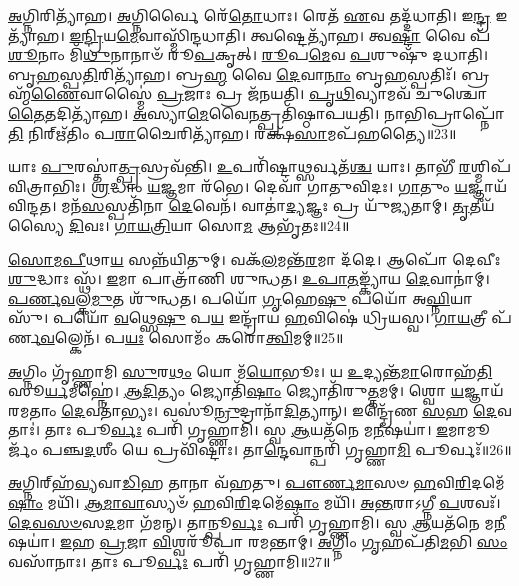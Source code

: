 \-\ul{𑌅}\-𑌗𑍍𑌨𑌿𑌰𑌿𑌤𑍍𑌯𑌾᳴𑌹।
\-\ul{𑌅}\-𑌗𑍍𑌨𑌿𑌰𑍍𑌵𑍈 𑌰𑍇᳴\-\ul{𑌤𑍋}\-𑌧𑌾𑌃।
𑌰𑍇𑌤᳴ \ul{𑌏}\-𑌵 𑌤𑌦𑍍𑌦᳴𑌧𑌾𑌤𑌿।
𑌇\-\ul{𑌨𑍍𑌦𑍍𑌰} 𑌇𑌤𑍍𑌯𑌾᳴𑌹।
\-\ul{𑌇}\-\-\ul{𑌨𑍍𑌦𑍍𑌰𑌿}\-𑌯\-\ul{𑌮𑍇}\-𑌵𑌾𑌸𑍍𑌮𑌿᳴𑌨𑍍𑌦𑌧𑌾𑌤𑌿।
𑌤𑍍𑌵𑌷𑍍𑌟𑍇𑌤𑍍𑌯𑌾᳴𑌹।
𑌤𑍍𑌵\-\ul{𑌷𑍍𑌟𑌾} 𑌵𑍈 𑌪᳴\-\ul{𑌶𑍂}\-𑌨𑌾𑌂 𑌮𑌿᳴\-\ul{𑌥𑍁}\-𑌨𑌾𑌨𑌾𑍞᳴ 𑌰𑍂\-\ul{𑌪}\-𑌕𑍃𑌤𑍍।
\-\ul{𑌰𑍂}\-𑌪\-\ul{𑌮𑍇}\-𑌵 \ul{𑌪}\-𑌶𑍁𑌷𑍁᳴ 𑌦𑌧𑌾𑌤𑌿।
𑌬𑍃\-\ul{𑌹}\-𑌸𑍍𑌪\-\ul{𑌤𑌿}\-𑌰𑌿𑌤𑍍𑌯𑌾᳴𑌹।
𑌬𑍍𑌰\-\ul{𑌹𑍍𑌮} 𑌵𑍈 \ul{𑌦𑍇}\-𑌵𑌾\-\ul{𑌨𑌾𑌂} 𑌬𑍃\-\ul{𑌹}\-𑌸𑍍𑌪𑌤𑌿𑌃᳴।
𑌬𑍍𑌰𑌹𑍍𑌮᳴\-\ul{𑌣𑍈}\-𑌵𑌾𑌸𑍍𑌮𑍈॑ \ul{𑌪𑍍𑌰}\-𑌜𑌾𑌃 𑌪𑍍𑌰 𑌜᳴𑌨𑌯𑌤𑌿।
\-\ul{𑌪𑍃}\-\-\ul{𑌥𑌿}\-𑌵𑍍𑌯𑌾𑌮𑌵᳴ 𑌚𑍁𑌶𑍍𑌚𑍋\-\ul{𑌤𑍈}\-𑌤𑌦𑌿𑌤𑍍𑌯𑌾᳴𑌹।
\-\ul{𑌅}\-𑌸𑍍𑌯𑌾\-\ul{𑌮𑍇}\-𑌵𑍈\-\ul{𑌨}\-𑌤𑍍𑌪𑍍𑌰𑌤𑌿᳴\-𑌷𑍍𑌠𑌾𑌪𑌯𑌤𑌿।
𑌨𑌾𑌭𑌿𑌪𑍍𑌰𑌾𑌪𑍍𑌨𑍋᳴\-\ul{𑌤𑌿} 𑌨𑌿𑌰𑍍‌\mbox{}𑌋᳴𑌤𑌿𑌂 𑌪\-\ul{𑌰𑌾}\-𑌚𑍈𑌰𑌿𑌤𑍍𑌯𑌾᳴𑌹।
𑌰𑌕𑍍𑌷᳴\-\ul{𑌸𑌾}\-𑌮𑌪᳴𑌹𑌤𑍍𑌯𑍈॥23॥

𑌯𑌾𑌃 \ul{𑌪𑍁}\-𑌰𑌸𑍍𑌤𑌾॑\-\ul{𑌤𑍍𑌪𑍍𑌰}\-𑌸𑍍𑌰𑌵᳴𑌨𑍍𑌤𑌿।
\-\ul{𑌉}\-𑌪𑌰𑌿᳴𑌷𑍍𑌟𑌾\-\ul{𑌥𑍍𑌸}\-𑌰𑍍𑌵𑌤᳴\-\ul{𑌶𑍍𑌚} 𑌯𑌾𑌃।
𑌤𑌾𑌭𑍀᳴ \ul{𑌰}\-𑌶𑍍𑌮𑌿𑌪᳴𑌵𑌿𑌤𑍍𑌰𑌾𑌭𑌿𑌃।
\-\ul{𑌶𑍍𑌰}\-𑌦𑍍𑌧𑌾𑌂 \ul{𑌯}\-𑌜𑍍𑌞𑌮𑌾 𑌰᳴𑌭𑍇।
𑌦𑍇𑌵𑌾᳴ 𑌗𑌾𑌤𑍁𑌵𑌿𑌦𑌃।
\-\ul{𑌗𑌾}\-𑌤𑍁𑌂 \ul{𑌯}\-𑌜𑍍𑌞𑌾𑌯᳴ 𑌵𑌿𑌨𑍍𑌦𑌤।
𑌮𑌨᳴\-\ul{𑌸}\-𑌸𑍍𑌪𑌤𑌿᳴𑌨𑌾 \ul{𑌦𑍇}\-𑌵𑍇𑌨᳴।
𑌵𑌾𑌤𑌾॑\-\ul{𑌦𑍍𑌯}\-𑌜𑍍𑌞𑌃 𑌪𑍍𑌰 𑌯𑍁᳴𑌜𑍍𑌯𑌤𑌾𑌮𑍍।
\-\ul{𑌤𑍃}\-𑌤𑍀𑌯᳴𑌸𑍍𑌯𑍈 \ul{𑌦𑌿}\-𑌵𑌃।
\-\ul{𑌗𑌾}\-\-\ul{𑌯}\-\-\ul{𑌤𑍍𑌰𑌿}\-𑌯𑌾 𑌸𑍋\-\ul{𑌮} 𑌆𑌭𑍃᳴𑌤𑌃॥24॥

\-\ul{𑌸𑍋}\-\-\ul{𑌮}\-\-\ul{𑌪𑍀}\-𑌥𑌾\-\ul{𑌯} 𑌸𑌨𑍍𑌨᳴𑌯𑌿𑌤𑍁𑌮𑍍।
𑌵𑌕᳴\-\ul{𑌲}\-𑌮𑌨𑍍𑌤᳴\-\ul{𑌰}\-𑌮𑌾 𑌦᳴𑌦𑍇।
𑌆𑌪𑍋᳴ 𑌦𑍇𑌵𑍀𑌃 \ul{𑌶𑍁}\-𑌦𑍍𑌧𑌾𑌃 𑌸𑍍𑌥᳴।
\-\ul{𑌇}\-𑌮𑌾 𑌪𑌾𑌤𑍍𑌰𑌾᳴𑌣𑌿 𑌶𑍁𑌨𑍍𑌧𑌤।
\-\ul{𑌉}\-\-\ul{𑌪𑌾}\-\-\ul{𑌤}\-𑌙𑍍𑌕𑍍𑌯𑌾᳴𑌯 \ul{𑌦𑍇}\-𑌵𑌾𑌨𑌾॑𑌮𑍍।
\-\ul{𑌪}\-\-\ul{𑌰𑍍𑌣}\-\-\ul{𑌵}\-𑌲𑍍𑌕\-\ul{𑌮𑍁}\-𑌤 𑌶𑍁᳴𑌨𑍍𑌧𑌤।
𑌪𑌯𑍋᳴ \ul{𑌗𑍃}\-𑌹𑍇\-\ul{𑌷𑍁} 𑌪𑌯𑍋᳴ 𑌅\-\ul{𑌘𑍍𑌨𑌿}\-𑌯𑌾𑌸𑍁᳴।
𑌪𑌯𑍋᳴ \ul{𑌵}\-𑌥𑍍𑌸𑍇\-\ul{𑌷𑍁} 𑌪\-\ul{𑌯} 𑌇𑌨𑍍𑌦𑍍𑌰𑌾᳴𑌯 \ul{𑌹}\-𑌵𑌿𑌷𑍇॑ 𑌧𑍍𑌰𑌿𑌯𑌸𑍍𑌵।
\-\ul{𑌗𑌾}\-\-\ul{𑌯}\-𑌤𑍍𑌰𑍀 𑌪᳴𑌰𑍍𑌣\-\ul{𑌵}\-𑌲𑍍𑌕𑍇𑌨᳴।
𑌪\-\ul{𑌯𑌃} 𑌸𑍋𑌮𑌂᳴ 𑌕𑌰𑍋\-\ul{𑌤𑍍𑌵𑌿}\-𑌮𑌮𑍍॥25॥

\-\ul{𑌅}\-𑌗𑍍𑌨𑌿𑌂 𑌗𑍃᳴𑌹𑍍𑌣𑌾𑌮𑌿 \ul{𑌸𑍁}\-𑌰\-\ul{𑌥𑌂} 𑌯𑍋 𑌮᳴\-\ul{𑌯𑍋}\-𑌭𑍂𑌃।
𑌯 \ul{𑌉}\-𑌦𑍍𑌯𑌨𑍍𑌤᳴\-\ul{𑌮𑌾}\-𑌰𑍋𑌹᳴\-\ul{𑌤𑌿} 𑌸𑍂\-\ul{𑌰𑍍𑌯}\-𑌮𑌹𑍍𑌨𑍇॑।
\-\ul{𑌆}\-\-\ul{𑌦𑌿}\-𑌤𑍍𑌯𑌂 𑌜𑍍𑌯𑍋𑌤𑌿᳴\-\ul{𑌷𑌾𑌂} 𑌜𑍍𑌯𑍋𑌤𑌿᳴𑌰𑍁\-\ul{𑌤𑍍𑌤}\-𑌮𑌮𑍍।
𑌶𑍍𑌵𑍋 \ul{𑌯}\-𑌜𑍍𑌞𑌾𑌯᳴ 𑌰𑌮𑌤𑌾𑌂 \ul{𑌦𑍇}\-𑌵𑌤𑌾॑𑌭𑍍𑌯𑌃।
𑌵𑌸𑍂॑\-\ul{𑌨𑍍𑌰𑍁}\-𑌦𑍍𑌰𑌾𑌨𑌾᳴\-\ul{𑌦𑌿}\-𑌤𑍍𑌯𑌾𑌨𑍍।
𑌇𑌨𑍍𑌦𑍍𑌰𑍇᳴𑌣 \ul{𑌸}\-𑌹 \ul{𑌦𑍇}\-𑌵𑌤𑌾𑌃॑।
𑌤𑌾𑌃 𑌪𑍂\-\ul{𑌰𑍍𑌵𑌃} 𑌪𑌰𑌿᳴ 𑌗𑍃𑌹𑍍𑌣𑌾𑌮𑌿।
𑌸𑍍𑌵 \ul{𑌆}\-𑌯𑌤᳴𑌨𑍇 𑌮\-\ul{𑌨𑍀}\-𑌷𑌯𑌾॑।
\-\ul{𑌇}\-𑌮𑌾𑌮𑍂𑌰𑍍𑌜𑌂᳴ 𑌪𑌞𑍍𑌚\-\ul{𑌦}\-𑌶𑍀𑌂 𑌯𑍇 𑌪𑍍𑌰𑌵𑌿᳴𑌷𑍍𑌟𑌾𑌃।
𑌤𑌾\-\ul{𑌨𑍍𑌦𑍇}\-𑌵𑌾𑌨𑍍𑌪𑌰𑌿᳴ 𑌗𑍃𑌹𑍍𑌣𑌾\-\ul{𑌮𑌿} 𑌪𑍂𑌰𑍍𑌵𑌃᳴॥26॥

\-\ul{𑌅}\-𑌗𑍍𑌨𑌿𑌰𑍍‌\mbox{}𑌹᳴\-\ul{𑌵𑍍𑌯}\-𑌵𑌾\-\ul{𑌡𑌿}\-𑌹 𑌤𑌾𑌨𑌾 𑌵᳴𑌹𑌤𑍁।
\-\ul{𑌪𑍗}\-\-\ul{𑌰𑍍𑌣}\-\-\ul{𑌮𑌾}\-𑌸𑍞 \ul{𑌹}\-𑌵𑌿\-\ul{𑌰𑌿}\-𑌦𑌮𑍇᳴\-\ul{𑌷𑌾𑌂} 𑌮𑌯𑌿᳴।
\-\ul{𑌆}\-\-\ul{𑌮𑌾}\-\-\ul{𑌵𑌾}\-𑌸𑍍𑌯𑍞᳴ \ul{𑌹}\-𑌵𑌿\-\ul{𑌰𑌿}\-𑌦𑌮𑍇᳴\-\ul{𑌷𑌾𑌂} 𑌮𑌯𑌿᳴।
\-\ul{𑌅}\-\-\ul{𑌨𑍍𑌤}\-𑌰𑌾\-𑌽𑌗𑍍𑌨𑍀 \ul{𑌪}\-𑌶𑌵𑌃᳴।
\-\ul{𑌦𑍇}\-\-\ul{𑌵}\-\-\ul{𑌸}\-\-\ul{𑍞}\-𑌸\-\ul{𑌦}\-𑌮𑌾 𑌗᳴𑌮𑌨𑍍।
𑌤𑌾𑌨𑍍𑌪𑍂\-\ul{𑌰𑍍𑌵𑌃} 𑌪𑌰𑌿᳴ 𑌗𑍃𑌹𑍍𑌣𑌾𑌮𑌿।
𑌸𑍍𑌵 \ul{𑌆}\-𑌯𑌤᳴𑌨𑍇 𑌮\-\ul{𑌨𑍀}\-𑌷𑌯𑌾॑।
\-\ul{𑌇}\-𑌹 \ul{𑌪𑍍𑌰}\-𑌜𑌾 \ul{𑌵𑌿}\-𑌶𑍍𑌵𑌰𑍂᳴𑌪𑌾 𑌰𑌮𑌨𑍍𑌤𑌾𑌮𑍍।
\-\ul{𑌅}\-𑌗𑍍𑌨𑌿𑌂 \ul{𑌗𑍃}\-𑌹𑌪᳴𑌤𑌿\-\ul{𑌮}\-𑌭𑌿 \ul{𑌸𑌂}\-𑌵𑌸𑌾᳴𑌨𑌾𑌃।
𑌤𑌾𑌃 𑌪𑍂\-\ul{𑌰𑍍𑌵𑌃} 𑌪𑌰𑌿᳴ 𑌗𑍃𑌹𑍍𑌣𑌾𑌮𑌿॥27॥

